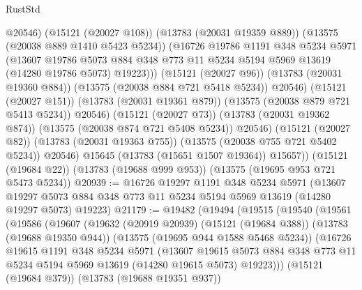 \begin{lexlean}{RustStd}
\begin{coremodule}
                    @20546)
                  (@15121 (@20027 @108))
                  (@13783 (@20031 @19359 @889))
                  (@13575 (@20038 @889 @1410 @5423 @5234))
                  (@16726
                    @19786
                    @1191
                    @348
                    @5234
                    @5971
                    (@13607
                      @19786
                      @5073
                      @884
                      @348
                      @773
                      @11
                      @5234
                      @5194
                      @5969
                      @13619
                      (@14280 @19786 @5073)
                      @19223)))
                (@15121 (@20027 @96))
                (@13783 (@20031 @19360 @884))
                (@13575 (@20038 @884 @721 @5418 @5234))
                @20546)
              (@15121 (@20027 @151))
              (@13783 (@20031 @19361 @879))
              (@13575 (@20038 @879 @721 @5413 @5234))
              @20546)
            (@15121 (@20027 @73))
            (@13783 (@20031 @19362 @874))
            (@13575 (@20038 @874 @721 @5408 @5234))
            @20546)
          (@15121 (@20027 @82))
          (@13783 (@20031 @19363 @755))
          (@13575 (@20038 @755 @721 @5402 @5234))
          @20546)
        @15645
        (@13783 (@15651 @1507 @19364))
        @15657))
    (@15121 (@19684 @22))
    (@13783 (@19688 @999 @953))
    (@13575 (@19695 @953 @721 @5473 @5234))
@20939 := @16726
    @19297
    @1191
    @348
    @5234
    @5971
    (@13607 @19297 @5073 @884 @348 @773 @11 @5234 @5194 @5969 @13619 (@14280 @19297 @5073) @19223)
@21179 := @19482
    (@19494
      (@19515
        (@19540
          (@19561
            (@19586
              (@19607
                (@19632
                  (@20919 @20939)
                  (@15121 (@19684 @388))
                  (@13783 (@19688 @19350 @944))
                  (@13575 (@19695 @944 @1588 @5468 @5234))
                  (@16726
                    @19615
                    @1191
                    @348
                    @5234
                    @5971
                    (@13607
                      @19615
                      @5073
                      @884
                      @348
                      @773
                      @11
                      @5234
                      @5194
                      @5969
                      @13619
                      (@14280 @19615 @5073)
                      @19223)))
                (@15121 (@19684 @379))
                (@13783 (@19688 @19351 @937))

\end{coremodule}
\end{lexlean}
